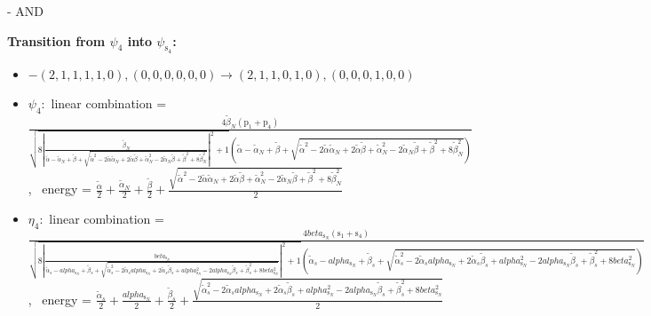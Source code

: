 \documentclass[12pt,a4paper]{article}
\begin{document}
 -  AND 

        \noindent\textbf{Transition from $\psi_{4}$ into $\psi_{\text{s}_{4}}$:}
        \begin{itemize}
            \item $- (2, 1, 1, 1, 1, 0), (0, 0, 0, 0, 0, 0) \rightarrow (2, 1, 1, 0, 1, 0), (0, 0, 0, 1, 0, 0)$
        
            \item $\psi_{4}:$ linear combination = $\frac{4 \tilde{\beta}_{N} \left(\text{p}_{1} + \text{p}_{4}\right)}{\sqrt{8 \left|{\frac{\tilde{\beta}_{N}}{\tilde{\alpha} - \tilde{\alpha}_{N} + \tilde{\beta} + \sqrt{\tilde{\alpha}^{2} - 2 \tilde{\alpha} \tilde{\alpha}_{N} + 2 \tilde{\alpha} \tilde{\beta} + \tilde{\alpha}_{N}^{2} - 2 \tilde{\alpha}_{N} \tilde{\beta} + \tilde{\beta}^{2} + 8 \tilde{\beta}_{N}^{2}}}}\right|^{2} + 1} \left(\tilde{\alpha} - \tilde{\alpha}_{N} + \tilde{\beta} + \sqrt{\tilde{\alpha}^{2} - 2 \tilde{\alpha} \tilde{\alpha}_{N} + 2 \tilde{\alpha} \tilde{\beta} + \tilde{\alpha}_{N}^{2} - 2 \tilde{\alpha}_{N} \tilde{\beta} + \tilde{\beta}^{2} + 8 \tilde{\beta}_{N}^{2}}\right)}$, \
            energy = $\frac{\tilde{\alpha}}{2} + \frac{\tilde{\alpha}_{N}}{2} + \frac{\tilde{\beta}}{2} + \frac{\sqrt{\tilde{\alpha}^{2} - 2 \tilde{\alpha} \tilde{\alpha}_{N} + 2 \tilde{\alpha} \tilde{\beta} + \tilde{\alpha}_{N}^{2} - 2 \tilde{\alpha}_{N} \tilde{\beta} + \tilde{\beta}^{2} + 8 \tilde{\beta}_{N}^{2}}}{2}$
            
            \item $\eta_{4}:$ linear combination = $\frac{4 beta_{\text{s}_N} \left(\text{s}_{1} + \text{s}_{4}\right)}{\sqrt{8 \left|{\frac{beta_{\text{s}_N}}{\tilde{\alpha}_{s} - alpha_{\text{s}_N} + \tilde{\beta}_{s} + \sqrt{\tilde{\alpha}_{s}^{2} - 2 \tilde{\alpha}_{s} alpha_{\text{s}_N} + 2 \tilde{\alpha}_{s} \tilde{\beta}_{s} + alpha_{\text{s}_N}^{2} - 2 alpha_{\text{s}_N} \tilde{\beta}_{s} + \tilde{\beta}_{s}^{2} + 8 beta_{\text{s}_N}^{2}}}}\right|^{2} + 1} \left(\tilde{\alpha}_{s} - alpha_{\text{s}_N} + \tilde{\beta}_{s} + \sqrt{\tilde{\alpha}_{s}^{2} - 2 \tilde{\alpha}_{s} alpha_{\text{s}_N} + 2 \tilde{\alpha}_{s} \tilde{\beta}_{s} + alpha_{\text{s}_N}^{2} - 2 alpha_{\text{s}_N} \tilde{\beta}_{s} + \tilde{\beta}_{s}^{2} + 8 beta_{\text{s}_N}^{2}}\right)}$, \
            energy = $\frac{\tilde{\alpha}_{s}}{2} + \frac{alpha_{\text{s}_N}}{2} + \frac{\tilde{\beta}_{s}}{2} + \frac{\sqrt{\tilde{\alpha}_{s}^{2} - 2 \tilde{\alpha}_{s} alpha_{\text{s}_N} + 2 \tilde{\alpha}_{s} \tilde{\beta}_{s} + alpha_{\text{s}_N}^{2} - 2 alpha_{\text{s}_N} \tilde{\beta}_{s} + \tilde{\beta}_{s}^{2} + 8 beta_{\text{s}_N}^{2}}}{2}$
            

\end{itemize}
\end{document}
